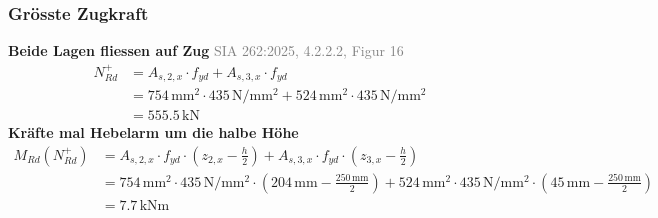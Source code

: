 \documentclass[11pt,a4paper]{article}
\newcommand{\normref}[1]{{\small\textcolor{gray}{#1}}}
\begin{document}
\subsubsection{Grösste Zugkraft}
\noindent\textbf{Beide Lagen fliessen auf Zug} \hfill \normref{SIA 262:2025, 4.2.2.2, Figur 16}
\begin{equation*}
\begin{aligned}
  N_{Rd}^{+} &= A_{s,2,x} \cdot f_{yd} + A_{s,3,x} \cdot f_{yd} \\
  &= 754\,\mathrm{mm}^{2} \cdot 435\,\mathrm{N}/\mathrm{mm}^{2} + 524\,\mathrm{mm}^{2} \cdot 435\,\mathrm{N}/\mathrm{mm}^{2} \\
  &= 555.5\,\mathrm{kN}
\end{aligned}
\end{equation*}
\noindent\textbf{Kräfte mal Hebelarm um die halbe Höhe}
\begin{equation*}
\begin{aligned}
  M_{Rd}(N_{Rd}^{+}) &= A_{s,2,x} \cdot f_{yd} \cdot \left(z_{2,x} - \tfrac{h}{2}\right) + A_{s,3,x} \cdot f_{yd} \cdot \left(z_{3,x} - \tfrac{h}{2}\right) \\
  &= 754\,\mathrm{mm}^{2} \cdot 435\,\mathrm{N}/\mathrm{mm}^{2} \cdot \left(204\,\mathrm{mm} - \tfrac{250\,\mathrm{mm}}{2}\right) + 524\,\mathrm{mm}^{2} \cdot 435\,\mathrm{N}/\mathrm{mm}^{2} \cdot \left(45\,\mathrm{mm} - \tfrac{250\,\mathrm{mm}}{2}\right) \\
  &= 7.7\,\mathrm{kNm}
\end{aligned}
\end{equation*}
\end{document}
